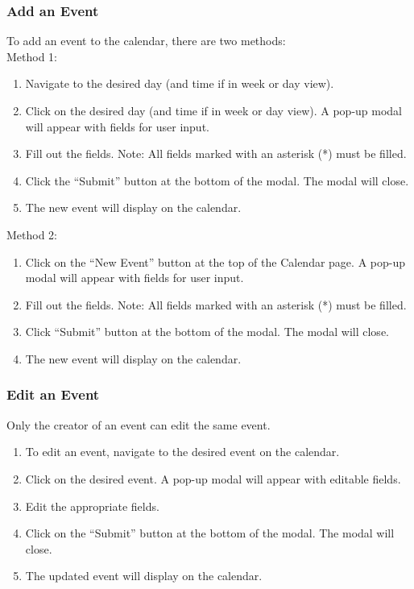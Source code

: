 \documentclass[12pt]{article}
\begin{document}
    \subsubsection{Add an Event}
    To add an event to the calendar, there are two methods: \\
    Method 1:
    \begin{enumerate}
        \item Navigate to the desired day (and time if in week or day view).
        \item Click on the desired day (and time if in week or day view). A pop-up modal will appear with fields for user input.
        \item Fill out the fields. Note: All fields marked with an asterisk (*) must be filled.
        \item Click the ``Submit'' button at the bottom of the modal. The modal will close.
        \item The new event will display on the calendar.
    \end{enumerate}
    Method 2:
    \begin{enumerate}
        \item Click on the ``New Event'' button at the top of the Calendar page. A pop-up modal will appear with fields for user input.
        \item Fill out the fields. Note: All fields marked with an asterisk (*) must be filled.
        \item Click ``Submit'' button at the bottom of the modal. The modal will close.
        \item The new event will display on the calendar.
    \end{enumerate}

    \subsubsection{Edit an Event}
    Only the creator of an event can edit the same event.
    \begin{enumerate}
        \item To edit an event, navigate to the desired event on the calendar.
        \item Click on the desired event. A pop-up modal will appear with editable fields.
        \item Edit the appropriate fields.
        \item Click on the ``Submit'' button at the bottom of the modal. The modal will close.
        \item The updated event will display on the calendar.
    \end{enumerate}
\end{document}
